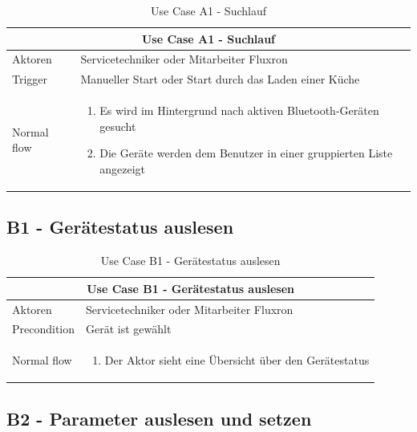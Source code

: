 \begin{table}[H]
\begin{tabular}{|p{3cm}|p{10cm}|}
  \hline
  \multicolumn{2}{|c|}{Use Case A1 - Suchlauf}
  \\\hline
  	Aktoren
  &
	Servicetechniker oder Mitarbeiter Fluxron
  \\\hline
  	Trigger
  &
    Manueller Start oder Start durch das Laden einer Küche
  \\\hline
  	Normal flow
  &
	\begin{enumerate}
	  \item Es wird im Hintergrund nach aktiven Bluetooth-Geräten gesucht
 	  \item Die Geräte werden dem Benutzer in einer gruppierten Liste angezeigt
	\end{enumerate}
  \\\hline
\end{tabular}
\caption{Use Case A1 - Suchlauf}
\end{table}

\subsection{B1 - Gerätestatus auslesen}
\label{subsec:B1 - Gerätestatus auslesen}

\begin{table}[H]
\begin{tabular}{|p{3cm}|p{10cm}|}
  \hline
  \multicolumn{2}{|c|}{Use Case B1 - Gerätestatus auslesen}
  \\\hline
  	Aktoren
  &
	Servicetechniker oder Mitarbeiter Fluxron
  \\\hline
  	Precondition
  &
    Gerät ist gewählt
  \\\hline
  	Normal flow
  &
	\begin{enumerate}
	  \item Der Aktor sieht eine Übersicht über den Gerätestatus
	\end{enumerate}
  \\\hline
\end{tabular}
\caption{Use Case B1 - Gerätestatus auslesen}
\end{table}

\subsection{B2 - Parameter auslesen und setzen}
\label{subsec:B2 - Parameter auslesen und setzen}

